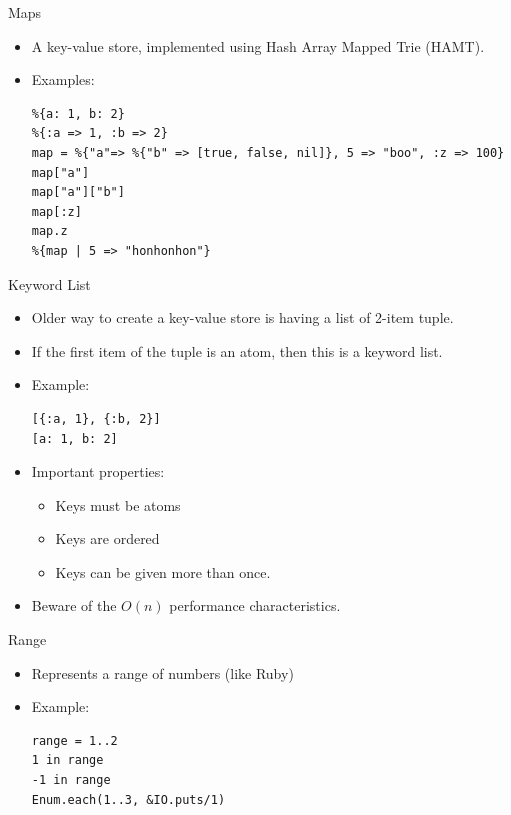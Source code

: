 \documentclass[12pt]{beamer}
\begin{document}
\begin{frame}[fragile]{Maps}
  \begin{itemize}
    \item A key-value store, implemented using Hash Array Mapped Trie (HAMT).
    \item Examples:
          \begin{verbatim}
%{a: 1, b: 2}
%{:a => 1, :b => 2}
map = %{"a"=> %{"b" => [true, false, nil]}, 5 => "boo", :z => 100}
map["a"]
map["a"]["b"]
map[:z]
map.z
%{map | 5 => "honhonhon"}
      \end{verbatim}
  \end{itemize}
\end{frame}

\begin{frame}[fragile]{Keyword List}
  \begin{itemize}
    \item Older way to create a key-value store is having a list of 2-item tuple.
    \item If the first item of the tuple is an atom, then this is a keyword list.
    \item Example:
          \begin{verbatim}
[{:a, 1}, {:b, 2}]
[a: 1, b: 2]
  \end{verbatim}
    \item Important properties:
          \begin{itemize}
            \item Keys must be atoms
            \item Keys are ordered
            \item Keys can be given more than once.
          \end{itemize}
    \item Beware of the $O(n)$ performance characteristics.
  \end{itemize}
\end{frame}

\begin{frame}[fragile]{Range}
  \begin{itemize}
    \item Represents a range of numbers (like Ruby)
    \item Example:
          \begin{verbatim}
range = 1..2
1 in range
-1 in range
Enum.each(1..3, &IO.puts/1)
    \end{verbatim}
  \end{itemize}
\end{frame}
\end{document}
